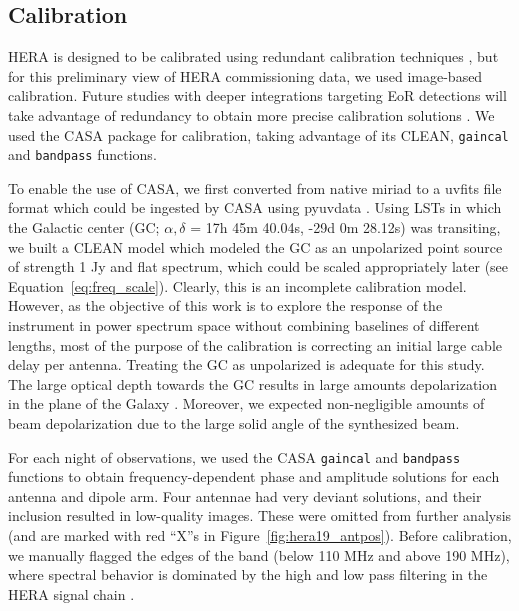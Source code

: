 \subsection{Calibration}
\label{subsec:hera19_cal}

HERA is designed to be calibrated using redundant calibration techniques \citep{Dillon.16}, but for this preliminary view of HERA commissioning data, we used image-based calibration. Future studies with deeper integrations targeting EoR detections will take advantage of redundancy to obtain more precise calibration solutions \citep{deBoer.17}. We used the {\sc CASA} \citep{casa} package for calibration, taking advantage of its CLEAN, {\tt gaincal} and {\tt bandpass} functions.

To enable the use of {\sc CASA}, we first converted from native {\sc miriad} to a {\sc uvfits} file format which could be ingested by {\sc CASA} using {\sc pyuvdata} \citep{pyuvdata}. 
Using LSTs in which the Galactic center (GC; $\alpha, \delta$ = 17h 45m 40.04s,​ ​-29d 0m 28.12s) was transiting, we built a CLEAN model which modeled the GC as an unpolarized point source of strength 1 Jy and flat spectrum, which could be scaled appropriately later (see Equation~\ref{eq:freq_scale}). 
Clearly, this is an incomplete calibration model. However, as the objective of this work is to explore the response of the instrument in power spectrum space without combining baselines of different lengths, most of the purpose of the calibration is correcting an initial large cable delay per antenna. 
Treating the GC as unpolarized is adequate for this study. The large optical depth towards the GC \citep{Oppermann.12} results in large amounts depolarization in the plane of the Galaxy \citep{Wolleben.06}. Moreover, we expected non-negligible amounts of beam depolarization due to the large solid angle of the synthesized beam.

For each night of observations, we used the {\sc CASA} {\tt gaincal} and {\tt bandpass} functions to obtain frequency-dependent phase and amplitude solutions for each antenna and dipole arm. Four antennae had very deviant solutions, and their inclusion resulted in low-quality images. These were omitted from further analysis (and are marked with red ``X''s in Figure~\ref{fig:hera19_antpos}).  Before calibration, we manually flagged the edges of the band (below 110 MHz and above 190 MHz), where spectral behavior is dominated by the high and low pass filtering in the HERA signal chain \citep{deBoer.17}.

